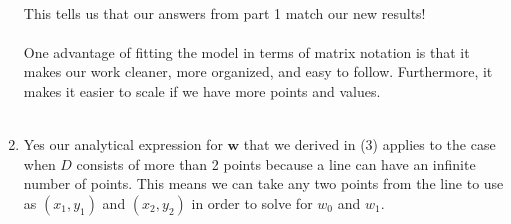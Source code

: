 \documentclass{harvardml}
\theoremstyle{definition}
\theoremstyle{plain}
\begin{document}
\begin{enumerate}
\begin{align}
    \end{align}
    This tells us that our answers from part 1 match our new results!\\
    \\
    One advantage of fitting the model in terms of matrix notation is that it makes our work cleaner, more organized, and easy to follow. Furthermore, it makes it easier to scale if we have more points and values.\\
    \\
    \item
    Yes our analytical expression for $\textbf{w}$ that we derived in (3) applies to the case when $D$ consists of more than 2 points because a line can have an infinite number of points. This means we can take any two points from the line to use as $(x_1, y_1)$ and $(x_2, y_2)$ in order to solve for $w_0$ and $w_1$.
\end{enumerate}
\pagebreak
\end{document}
